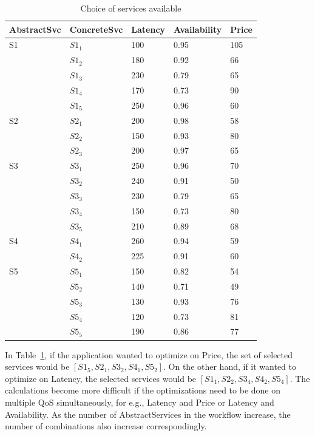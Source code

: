 \documentclass[10pt,journal,compsoc]{IEEEtran}
\begin{document}
 \begin{table} \footnotesize
	\centering
	\begin{tabular}{lllll}
\toprule
   \small{\textbf{AbstractSvc}} &   \textbf{ConcreteSvc} &   \textbf{Latency} &   \textbf{Availability} &   \textbf{Price}\\ 
\midrule
S1 
 & $S1_{1}$ & 100 & 0.95 & 105\\
 & $S1_{2}$ & 180 & 0.92 & 66\\
 & $S1_{3}$ & 230 & 0.79 & 65\\
 & $S1_{4}$ & 170 & 0.73 & 90\\
 & $S1_{5}$ & 250 & 0.96 & 60\\ 

S2 
 & $S2_{1}$ & 200 & 0.98 & 58\\
 & $S2_{2}$ & 150 & 0.93 & 80\\
 & $S2_{3}$ & 200 & 0.97 & 65\\ 
 

S3
 & $S3_{1}$ & 250 & 0.96 & 70\\
 & $S3_{2}$ & 240 & 0.91 & 50\\
 & $S3_{3}$ & 230 & 0.79 & 65\\ 
 & $S3_{4}$ & 150 & 0.73 & 80\\
 & $S3_{5}$ & 210 & 0.89 & 68\\ 

S4
 & $S4_{1}$ & 260 & 0.94 & 59\\
 & $S4_{2}$ & 225 & 0.91 & 60\\

S5
 & $S5_{1}$ & 150 & 0.82 & 54\\
 & $S5_{2}$ & 140 & 0.71 & 49\\
 & $S5_{3}$ & 130 & 0.93 & 76\\ 
 & $S5_{4}$ & 120 & 0.73 & 81\\
 & $S5_{5}$ & 190 & 0.86 & 77\\ 

\bottomrule

\end{tabular}
\caption{Choice of services available \label{tbl:choice-of-services}}
\end{table} 
 

 In Table~\ref{tbl:choice-of-services}, if the application wanted to optimize on Price, the set of selected services would be $[S1_{5}, S2_{1}, S3_{2}, S4_{1}, S5_{2}]$. On the other hand, if it wanted to optimize on Latency, the selected services would be $[S1_{1}, S2_{2}, S3_{4}, S4_{2}, S5_{4}]$. The calculations become more difficult if the optimizations need to be done on multiple QoS simultaneously, for e.g., Latency and Price or Latency and Availability. As the number of AbstractServices in the workflow increase, the number of combinations also increase correspondingly.
\end{document}

